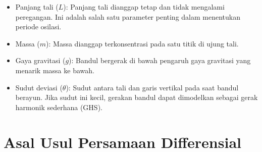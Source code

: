 \documentclass{article}
\begin{document}
\begin{itemize}
    \item Panjang tali ($L$): Panjang tali dianggap tetap dan tidak mengalami peregangan. Ini adalah salah satu parameter penting dalam menentukan periode osilasi.
    \item Massa ($m$): Massa dianggap terkonsentrasi pada satu titik di ujung tali.
    \item Gaya gravitasi ($g$): Bandul bergerak di bawah pengaruh gaya gravitasi yang menarik massa ke bawah.
    \item Sudut deviasi ($\theta$): Sudut antara tali dan garis vertikal pada saat bandul berayun. Jika sudut ini kecil, gerakan bandul dapat dimodelkan sebagai gerak harmonik sederhana (GHS).
\end{itemize}


\section{Asal Usul Persamaan Differensial}
\end{document}
